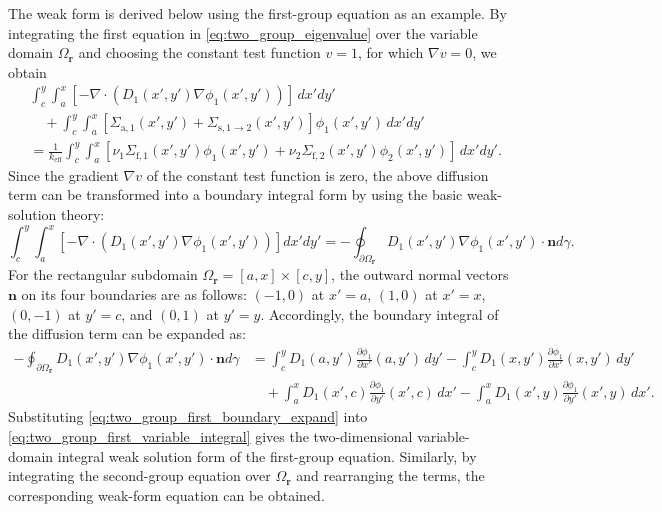 \documentclass[final,3p,times,sort&compress]{elsarticle}
\begin{document}
The weak form is derived below using the first-group equation as an example. By integrating the first equation in \cref{eq:two_group_eigenvalue} over the variable domain $\Omega_{\boldsymbol r}$ and choosing the constant test function $v=1$, for which $\nabla v=0$, we obtain
\begin{equation}
\begin{aligned}
    & \int_{c}^{y} \int_{a}^{x} \left[ -\nabla \cdot \left( D_1(x',y') \nabla \phi_1(x',y') \right) \right] \,dx'dy' \\
    &\quad + \int_{c}^{y} \int_{a}^{x} \left[ \Sigma_{\mathrm a,1}(x',y') + \Sigma_{\mathrm s,1\rightarrow2}(x',y') \right] \phi_1(x',y') \,dx'dy' \\
    &= \frac{1}{k_{\mathrm{eff}}} \int_{c}^{y} \int_{a}^{x} \left[ \nu_1\Sigma_{\mathrm f,1}(x',y')\phi_1(x',y') + \nu_2\Sigma_{\mathrm f,2}(x',y')\phi_2(x',y') \right] \,dx'dy' .
\end{aligned}
\label{eq:two_group_first_variable_integral}
\end{equation}
Since the gradient $\nabla v$ of the constant test function is zero, the above diffusion term can be transformed into a boundary integral form by using the basic weak-solution theory:
\begin{equation}
\int_{c}^{y} \int_{a}^{x} \left[ -\nabla \cdot \left( D_1(x',y') \nabla \phi_1(x',y') \right) \right] dx'dy' = -\oint_{\partial\Omega_{\boldsymbol r}} D_1(x',y') \nabla \phi_1(x',y') \cdot \boldsymbol n d\gamma .
\label{eq:two_group_first_gauss_green}
\end{equation}
For the rectangular subdomain $\Omega_{\boldsymbol r}=[a,x]\times[c,y]$, the outward normal vectors $\boldsymbol n$ on its four boundaries are as follows: $(-1,0)$ at $x'=a$, $(1,0)$ at $x'=x$, $(0,-1)$ at $y'=c$, and $(0,1)$ at $y'=y$. Accordingly, the boundary integral of the diffusion term can be expanded as:
\begin{equation}
\begin{aligned}
     -\oint_{\partial\Omega_{\boldsymbol r}} D_1(x',y') \nabla \phi_1(x',y') \cdot \boldsymbol n d\gamma
    &= \int_{c}^{y} D_1(a,y') \frac{\partial \phi_1}{\partial x'}(a,y') \,dy' - \int_{c}^{y} D_1(x,y') \frac{\partial \phi_1}{\partial x'}(x,y') \,dy' \\
    &\quad + \int_{a}^{x} D_1(x',c) \frac{\partial \phi_1}{\partial y'}(x',c) \,dx' - \int_{a}^{x} D_1(x',y) \frac{\partial \phi_1}{\partial y'}(x',y) \,dx' .
\end{aligned}
\label{eq:two_group_first_boundary_expand}
\end{equation}
Substituting \cref{eq:two_group_first_boundary_expand} into \cref{eq:two_group_first_variable_integral} gives the two-dimensional variable-domain integral weak solution form of the first-group equation. Similarly, by integrating the second-group equation over $\Omega_{\boldsymbol r}$ and rearranging the terms, the corresponding weak-form equation can be obtained.
\end{document}
